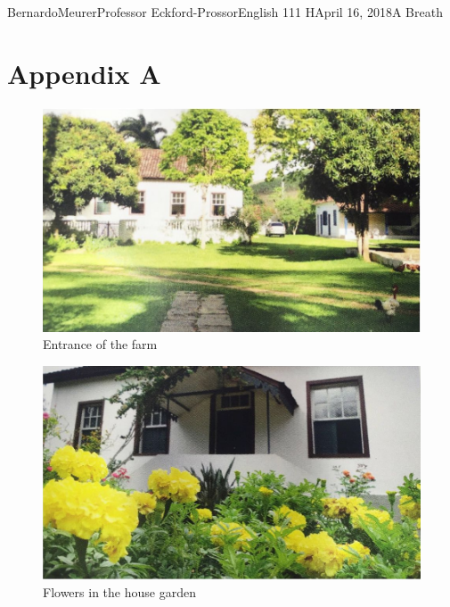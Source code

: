 \documentclass[12pt,letterpaper]{article}
\begin{document}
\begin{mla}{Bernardo}{Meurer}{Professor Eckford-Prossor}{English 111 H}{April 16, 2018}{A Breath}
	\section*{Appendix A}
	\begin{figure}[H]
		\centering
		\includegraphics[scale=0.5]{entrance.jpeg}
		\caption{Entrance of the farm}
	\end{figure}
	\begin{figure}[H]
		\centering
		\includegraphics[scale=0.42]{flowers.jpeg}
		\caption{Flowers in the house garden}
	\end{figure}
	\begin{figure}
		\centering
		\begin{minipage}{.5\textwidth}
			\centering

\end{minipage}
\end{figure}
\end{mla}
\end{document}
